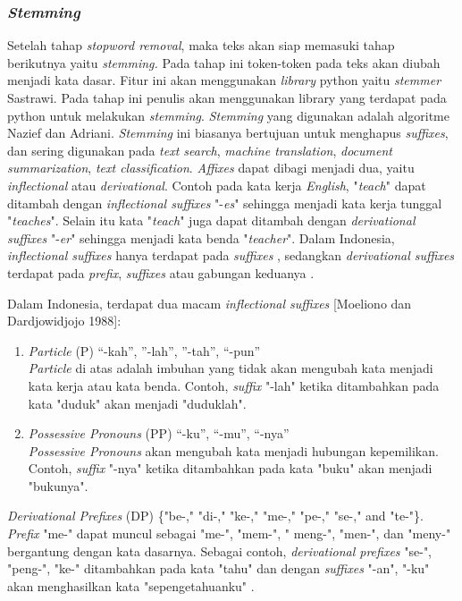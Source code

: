 \subsubsection{\textit{Stemming}}
Setelah tahap \textit{stopword removal}, maka teks akan siap memasuki 
tahap berikutnya yaitu \textit{stemming. }Pada tahap ini token-token 
pada teks akan diubah menjadi kata dasar. Fitur ini akan menggunakan 
\textit{library} python yaitu \textit{stemmer }Sastrawi. Pada tahap 
ini penulis akan menggunakan library yang terdapat pada python untuk 
melakukan \textit{stemming}. \textit{Stemming} yang digunakan 
adalah algoritme Nazief dan Adriani. \textit{Stemming }ini biasanya 
bertujuan untuk menghapus \textit{suffixes}, dan sering digunakan 
pada \textit{text search},\textit{ machine translation},\textit{ 
	document summarization},\textit{ text classification}. \textit{
	Affixes }dapat dibagi menjadi dua, yaitu \textit{inflectional }atau 
\textit{derivational}. Contoh pada kata kerja \textit{English}, 
"\textit{teach}" dapat ditambah dengan \textit{inflectional 
	suffixes }"-\textit{es}" sehingga menjadi kata kerja tunggal "\textit{teaches}". Selain itu kata "\textit{teach}" juga dapat 
ditambah dengan \textit{derivational suffixes }"-\textit{er}" 
sehingga menjadi kata benda "\textit{teacher}". Dalam Indonesia, 
\textit{inflectional suffixes }hanya terdapat pada \textit{suffixes}
, sedangkan \textit{derivational suffixes} terdapat pada \textit{
	prefix}, \textit{suffixes} atau gabungan keduanya \cite{12}.

Dalam Indonesia, terdapat dua macam \textit{inflectional suffixes} [Moeliono dan Dardjowidjojo 1988]:
\begin{enumerate}[leftmargin=*]
	\item \textit{Particle} (P) {“-kah”, ”-lah”, ”-tah”, “-pun”}\\
	\textit{Particle }di atas adalah imbuhan yang tidak akan mengubah kata 
	menjadi kata kerja atau kata benda. Contoh, \textit{suffix }"-lah" 
	ketika ditambahkan pada kata "duduk" akan menjadi "duduklah".
	\item \textit{Possessive Pronouns} (PP) {“-ku”, “-mu”, “-nya”}\\
	\textit{Possessive Pronouns }akan mengubah kata menjadi hubungan 
	kepemilikan. Contoh, \textit{suffix} "-nya" ketika ditambahkan pada 
	kata "buku" akan menjadi "bukunya".
\end{enumerate}

\textit{Derivational Prefixes }(DP) \{"be-," "di-," "ke-," 
"me-," "pe-," "se-," and "te-"\}. \textit{Prefix }"me-" dapat muncul sebagai "me-", "mem-", " meng-", "men-", dan "meny-" bergantung dengan kata dasarnya. Sebagai contoh, \textit{derivational prefixes} "se-", "peng-", "ke-" ditambahkan pada kata "tahu" dan dengan \textit{suffixes }"-an", "-ku" akan menghasilkan kata "sepengetahuanku" \cite{12}.

